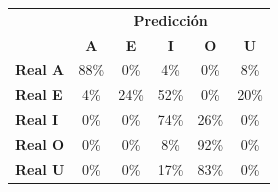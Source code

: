 \begin{tabular}{lccccc}
\toprule
 & \multicolumn{5}{c}{\textbf{Predicción}} \\
 & \textbf{A} & \textbf{E} & \textbf{I} & \textbf{O} & \textbf{U} \\
\midrule
\textbf{Real A} & \cellcolor[rgb]{0.39,0.39,1.00} \color{white} 88\% & \cellcolor[rgb]{1.00,1.00,1.00}  0\% & \cellcolor[rgb]{0.97,0.97,1.00}  4\% & \cellcolor[rgb]{1.00,1.00,1.00}  0\% & \cellcolor[rgb]{0.94,0.94,1.00}  8\% \\
\textbf{Real E} & \cellcolor[rgb]{0.97,0.97,1.00}  4\% & \cellcolor[rgb]{0.83,0.83,1.00}  24\% & \cellcolor[rgb]{0.64,0.64,1.00} \color{white} 52\% & \cellcolor[rgb]{1.00,1.00,1.00}  0\% & \cellcolor[rgb]{0.86,0.86,1.00}  20\% \\
\textbf{Real I} & \cellcolor[rgb]{1.00,1.00,1.00}  0\% & \cellcolor[rgb]{1.00,1.00,1.00}  0\% & \cellcolor[rgb]{0.48,0.48,1.00} \color{white} 74\% & \cellcolor[rgb]{0.82,0.82,1.00}  26\% & \cellcolor[rgb]{1.00,1.00,1.00}  0\% \\
\textbf{Real O} & \cellcolor[rgb]{1.00,1.00,1.00}  0\% & \cellcolor[rgb]{1.00,1.00,1.00}  0\% & \cellcolor[rgb]{0.94,0.94,1.00}  8\% & \cellcolor[rgb]{0.36,0.36,1.00} \color{white} 92\% & \cellcolor[rgb]{1.00,1.00,1.00}  0\% \\
\textbf{Real U} & \cellcolor[rgb]{1.00,1.00,1.00}  0\% & \cellcolor[rgb]{1.00,1.00,1.00}  0\% & \cellcolor[rgb]{0.88,0.88,1.00}  17\% & \cellcolor[rgb]{0.42,0.42,1.00} \color{white} 83\% & \cellcolor[rgb]{1.00,1.00,1.00}  0\% \\
\bottomrule
\end{tabular}